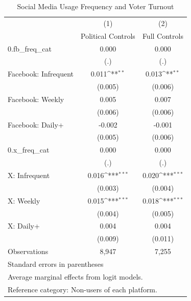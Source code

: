 \begin{table}[htbp]\centering
\def\sym#1{\ifmmode^{#1}\else\(^{#1}\)\fi}
\caption{Social Media Usage Frequency and Voter Turnout}
\begin{tabular}{l*{2}{c}}
\toprule
            &\multicolumn{1}{c}{(1)}&\multicolumn{1}{c}{(2)}\\
            &\multicolumn{1}{c}{Political Controls}&\multicolumn{1}{c}{Full Controls}\\
\midrule
0.fb\_freq\_cat&       0.000         &       0.000         \\
            &         (.)         &         (.)         \\
\addlinespace
Facebook: Infrequent&       0.011\sym{**} &       0.013\sym{**} \\
            &     (0.005)         &     (0.006)         \\
\addlinespace
Facebook: Weekly&       0.005         &       0.007         \\
            &     (0.006)         &     (0.006)         \\
\addlinespace
Facebook: Daily+&      -0.002         &      -0.001         \\
            &     (0.005)         &     (0.006)         \\
\addlinespace
0.x\_freq\_cat&       0.000         &       0.000         \\
            &         (.)         &         (.)         \\
\addlinespace
X: Infrequent&       0.016\sym{***}&       0.020\sym{***}\\
            &     (0.003)         &     (0.004)         \\
\addlinespace
X: Weekly   &       0.015\sym{***}&       0.018\sym{***}\\
            &     (0.004)         &     (0.005)         \\
\addlinespace
X: Daily+   &       0.004         &       0.004         \\
            &     (0.009)         &     (0.011)         \\
\midrule
Observations&       8,947         &       7,255         \\
\bottomrule
\multicolumn{3}{l}{\footnotesize Standard errors in parentheses}\\
\multicolumn{3}{l}{\footnotesize Average marginal effects from logit models.}\\
\multicolumn{3}{l}{\footnotesize Reference category: Non-users of each platform.}\\

\end{tabular}
\end{table}
